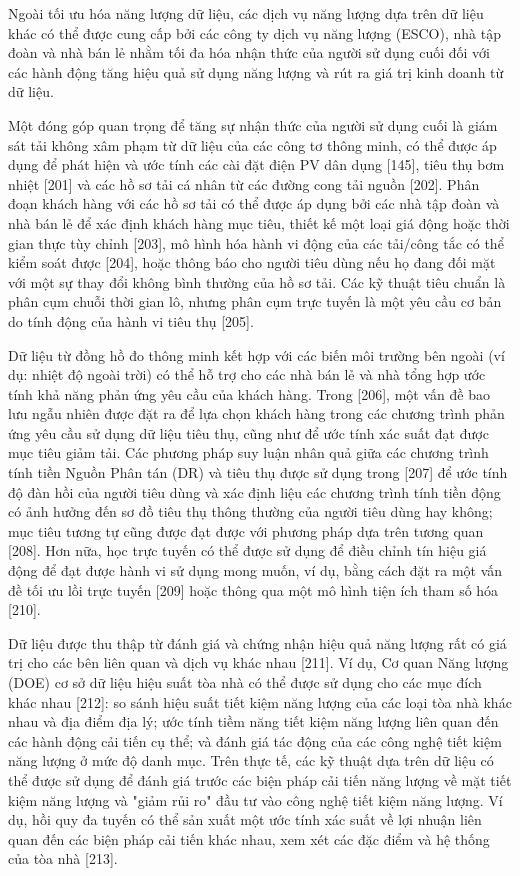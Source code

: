 \documentclass[utf8]{frontiersSCNS} %
\begin{document}
Ngoài tối ưu hóa năng lượng dữ liệu, các dịch vụ năng lượng dựa trên dữ liệu khác có thể được cung cấp bởi các công ty dịch vụ năng lượng (ESCO), nhà tập đoàn và nhà bán lẻ nhằm tối đa hóa nhận thức của người sử dụng cuối đối với các hành động tăng hiệu quả sử dụng năng lượng và rút ra giá trị kinh doanh từ dữ liệu.

Một đóng góp quan trọng để tăng sự nhận thức của người sử dụng cuối là giám sát tải không xâm phạm từ dữ liệu của các công tơ thông minh, có thể được áp dụng để phát hiện và ước tính các cài đặt điện PV dân dụng [145], tiêu thụ bơm nhiệt [201] và các hồ sơ tải cá nhân từ các đường cong tải nguồn [202]. Phân đoạn khách hàng với các hồ sơ tải có thể được áp dụng bởi các nhà tập đoàn và nhà bán lẻ để xác định khách hàng mục tiêu, thiết kế một loại giá động hoặc thời gian thực tùy chỉnh [203], mô hình hóa hành vi động của các tải/công tắc có thể kiểm soát được [204], hoặc thông báo cho người tiêu dùng nếu họ đang đối mặt với một sự thay đổi không bình thường của hồ sơ tải. Các kỹ thuật tiêu chuẩn là phân cụm chuỗi thời gian lô, nhưng phân cụm trực tuyến là một yêu cầu cơ bản do tính động của hành vi tiêu thụ [205].

Dữ liệu từ đồng hồ đo thông minh kết hợp với các biến môi trường bên ngoài (ví dụ: nhiệt độ ngoài trời) có thể hỗ trợ cho các nhà bán lẻ và nhà tổng hợp ước tính khả năng phản ứng yêu cầu của khách hàng. Trong [206], một vấn đề bao lưu ngẫu nhiên được đặt ra để lựa chọn khách hàng trong các chương trình phản ứng yêu cầu sử dụng dữ liệu tiêu thụ, cũng như để ước tính xác suất đạt được mục tiêu giảm tải. Các phương pháp suy luận nhân quả giữa các chương trình tính tiền Nguồn Phân tán (DR) và tiêu thụ được sử dụng trong [207] để ước tính độ đàn hồi của người tiêu dùng và xác định liệu các chương trình tính tiền động có ảnh hưởng đến sơ đồ tiêu thụ thông thường của người tiêu dùng hay không; mục tiêu tương tự cũng được đạt được với phương pháp dựa trên tương quan [208]. Hơn nữa, học trực tuyến có thể được sử dụng để điều chỉnh tín hiệu giá động để đạt được hành vi sử dụng mong muốn, ví dụ, bằng cách đặt ra một vấn đề tối ưu lồi trực tuyến [209] hoặc thông qua một mô hình tiện ích tham số hóa [210].


Dữ liệu được thu thập từ đánh giá và chứng nhận hiệu quả năng lượng rất có giá trị cho các bên liên quan và dịch vụ khác nhau [211]. Ví dụ, Cơ quan Năng lượng (DOE) cơ sở dữ liệu hiệu suất tòa nhà có thể được sử dụng cho các mục đích khác nhau [212]: so sánh hiệu suất tiết kiệm năng lượng của các loại tòa nhà khác nhau và địa điểm địa lý; ước tính tiềm năng tiết kiệm năng lượng liên quan đến các hành động cải tiến cụ thể; và đánh giá tác động của các công nghệ tiết kiệm năng lượng ở mức độ danh mục. Trên thực tế, các kỹ thuật dựa trên dữ liệu có thể được sử dụng để đánh giá trước các biện pháp cải tiến năng lượng về mặt tiết kiệm năng lượng và "giảm rủi ro" đầu tư vào công nghệ tiết kiệm năng lượng. Ví dụ, hồi quy đa tuyến có thể sản xuất một ước tính xác suất về lợi nhuận liên quan đến các biện pháp cải tiến khác nhau, xem xét các đặc điểm và hệ thống của tòa nhà [213].
\end{document}
